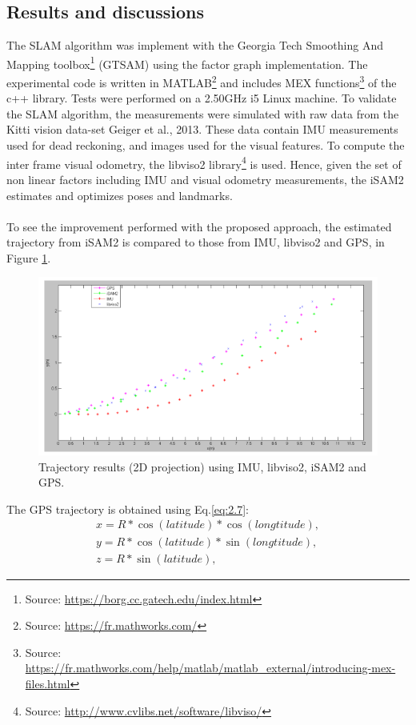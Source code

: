\documentclass[11pt,openany]{book}
\begin{document}
\subsection{Results and discussions}
The SLAM algorithm was implement with the Georgia Tech Smoothing And Mapping toolbox\footnote{Source: \url{https://borg.cc.gatech.edu/index.html}} (GTSAM) using the factor graph implementation. The experimental code is written in MATLAB\footnote{Source: \url{https://fr.mathworks.com/}} and includes MEX functions\footnote{Source: \url{https://fr.mathworks.com/help/matlab/matlab_external/introducing-mex-files.html}} of the c++ library. Tests were performed on a 2.50GHz i5 Linux machine. To validate the SLAM algorithm, the measurements were simulated with raw data from the Kitti vision data-set Geiger et al., 2013. These data contain IMU measurements used for dead reckoning, and images used for the visual features. To compute the inter frame visual odometry, the libviso2 library\footnote{Source: \url{http://www.cvlibs.net/software/libviso/}} is used. Hence, given the set of non linear factors including IMU and visual odometry measurements, the iSAM2 estimates and optimizes poses and landmarks.\\\\
To see the improvement performed with the proposed approach, the estimated trajectory from iSAM2 is compared to those from IMU, libviso2 and GPS, in Figure \ref{fig:2.14}.
\begin{figure}[H]
    \centering
    \includegraphics[scale=0.5]{assets/2_14.png}
    \caption{Trajectory results (2D projection) using IMU, libviso2, iSAM2 and GPS.}
    \label{fig:2.14}
\end{figure}
The GPS trajectory is obtained using Eq.\ref{eq:2.7}:
\begin{equation}\label{eq:2.7}
    \begin{split}
        x=R*\cos(latitude)*\cos(longtitude), \\
        y=R*\cos(latitude)*\sin(longtitude), \\
        z=R*\sin(latitude),
    \end{split}
\end{equation}
\end{document}
